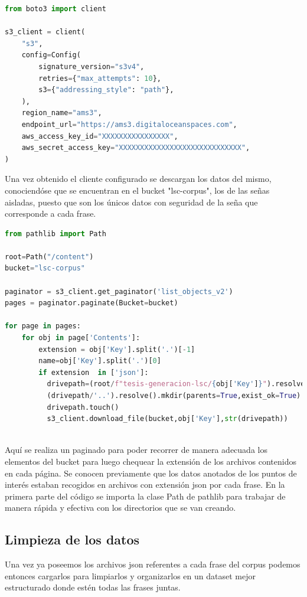\vspace{0.5cm}

\begin{lstlisting}[language=Python, caption={Instanciar cliente s3}, label={code:s3client}]
from boto3 import client

s3_client = client(
    "s3",
    config=Config(
        signature_version="s3v4",
        retries={"max_attempts": 10},
        s3={"addressing_style": "path"},
    ),
    region_name="ams3",
    endpoint_url="https://ams3.digitaloceanspaces.com",
    aws_access_key_id="XXXXXXXXXXXXXXXX",
    aws_secret_access_key="XXXXXXXXXXXXXXXXXXXXXXXXXXXXX",
)
\end{lstlisting}

Una vez obtenido el cliente configurado se descargan los datos del mismo, conociendóse que se encuentran en el bucket "lsc-corpus", los de las señas aisladas, puesto que son los únicos datos con seguridad de la seña que corresponde a cada frase.

\vspace{0.5cm}

\begin{lstlisting}[language=Python, caption={Descargar usando el cliente s3}, label={code:download_s3client}]
from pathlib import Path

root=Path("/content")
bucket="lsc-corpus"    

paginator = s3_client.get_paginator('list_objects_v2')
pages = paginator.paginate(Bucket=bucket)

for page in pages:
    for obj in page['Contents']:
        extension = obj['Key'].split('.')[-1]
        name=obj['Key'].split('.')[0]
        if extension  in ['json']:
		  drivepath=(root/f"tesis-generacion-lsc/{obj['Key']}").resolve()
  		  (drivepath/'..').resolve().mkdir(parents=True,exist_ok=True)
  		  drivepath.touch()
  		  s3_client.download_file(bucket,obj['Key'],str(drivepath))
  
\end{lstlisting}
Aquí se realiza un paginado para poder recorrer de manera adecuada  los elementos del bucket para luego chequear la extensión de los archivos contenidos en cada página.
Se conocen previamente que los datos anotados de los puntos de interés estaban recogidos en archivos con extensión json por cada frase. En la primera parte del código se importa la clase Path de pathlib para trabajar de manera rápida y efectiva con los directorios que se van creando.

\subsection{Limpieza de los datos}
Una vez ya poseemos los archivos json referentes a cada frase del corpus podemos entonces cargarlos para limpiarlos y organizarlos en un dataset mejor estructurado donde estén todas las frases juntas.

